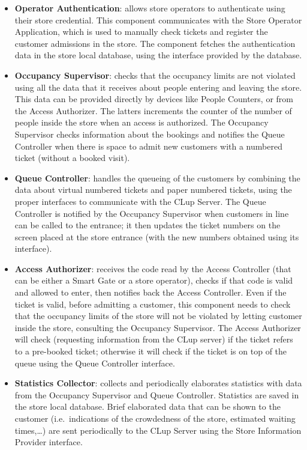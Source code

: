 \begin{itemize}
    \item \textbf{Operator Authentication}: allows store operators to authenticate using their store credential. This component communicates with the Store Operator Application, which is used to manually check tickets and register the customer admissions in the store. The component fetches the authentication data in the store local database, using the interface provided by the database.
    \item \textbf{Occupancy Supervisor}: checks that the occupancy limits are not violated using all the data that it receives about people entering and leaving the store. This data can be provided directly by devices like People Counters, or from the Access Authorizer. The latters increments the counter of the number of people inside the store when an access is authorized. The Occupancy Supervisor checks information about the bookings and notifies the Queue Controller when there is space to admit new customers with a numbered ticket (without a booked visit).
    \item \textbf{Queue Controller}: handles the queueing of the customers by combining the data about virtual numbered tickets and paper numbered tickets, using the proper interfaces to communicate with the CLup Server. The Queue Controller is notified by the Occupancy Supervisor when customers in line can be called to the entrance; it then updates the ticket numbers on the screen placed at the store entrance (with the new numbers obtained using its interface).
    \item \textbf{Access Authorizer}: receives the code read by the Access Controller (that can be either a Smart Gate or a store operator), checks if that code is valid and allowed to enter, then notifies back the Access Controller. Even if the ticket is valid, before admitting a customer, this component needs to check that the occupancy limits of the store will not be violated by letting customer inside the store, consulting the Occupancy Supervisor. The Access Authorizer will check (requesting information from the CLup server) if the ticket refers to a pre-booked ticket; otherwise it will check if the ticket is on top of the queue using the Queue Controller interface.
    \item \textbf{Statistics Collector}: collects and periodically elaborates statistics with data from the Occupancy Supervisor and Queue Controller. Statistics are saved in the store local database. Brief elaborated data that can be shown to the customer (i.e.~indications of the crowdedness of the store, estimated waiting times,\ldots) are sent periodically to the CLup Server using the Store Information Provider interface.
\end{itemize}
